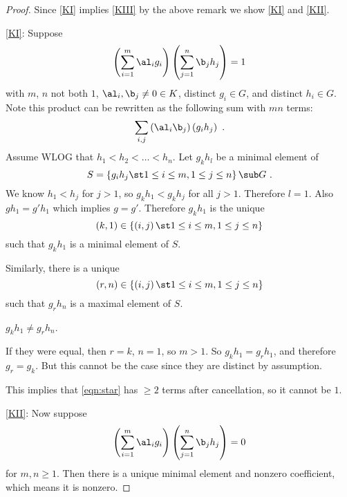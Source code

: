 \begin{proof}
Since \cref{KI} implies \cref{KIII} by the above remark
we show \cref{KI} and \cref{KII}. 

\cref{KI}: Suppose
\begin{equation}
\left(
\sum_{i = 1}^m \al_i g_i
\right)
\left(\sum_{j = 1}^n \b_j h_j\right) = 1
\end{equation}
with $m$, $n$ not both $1$, $\al_i , \b_j \neq 0\in K$, distinct $g_i\in G$, and distinct
$h_i\in G$.
Note this product can be rewritten as the following sum with $mn$ terms:
\begin{equation}
\label{eqn:star}
\sum_{i,j} \left(\al_i \b_j\right)\left(g_i h_j\right) \ .
\end{equation}
Assume WLOG that $h_1 < h_2 < \ldots < h_n$. Let $g_k h_l$ be a minimal element of
\begin{equation}
S = \left\{g_i h_j \st 1 \leq i\leq m , 1 \leq j\leq n\right\}
\sub G
\ .
\end{equation}
We know $h_1 < h_j$ for $j > 1$, so $g_k h_1 < g_k h_j$ for all $j > 1$.
Therefore $l = 1$.
Also $gh_1 = g'h_1$ which implies $g = g'$.
Therefore $g_k h_1$ is the unique
\begin{equation}
\left(k,1\right)\in \left\{\left(i,j\right) \st 1\leq i \leq m , 1\leq j \leq n\right\}
\end{equation}
such that $g_k h_1$ is a minimal element of $S$.

Similarly, there is a unique 
\begin{equation}
\left(r,n\right)\in \left\{\left(i,j\right) \st 1\leq i \leq m, 1\leq j\leq n\right\}
\end{equation}
such that $g_r h_n$ is a maximal element of $S$.
\begin{clm}
$g_k h_1 \neq g_r h_n$.
\end{clm}
If they were equal, then $r = k$, $n = 1$, so $m > 1$.
So $g_k h_1 = g_r h_1$, and therefore $g_r = g_k$. But this cannot be the case since they
are distinct by assumption.

This implies that \eqref{eqn:star}
has $\geq 2$ terms after cancellation, so it cannot be $1$.

\cref{KII}: Now suppose
\begin{equation}
\left(\sum_{i = 1}^m \al_i g_i\right) \left(\sum_{j = 1}^n \b_j h_j\right) = 0
\end{equation}
for $m , n \geq 1$. Then there is a unique minimal element and nonzero coefficient, which
means it is nonzero.
\end{proof}

